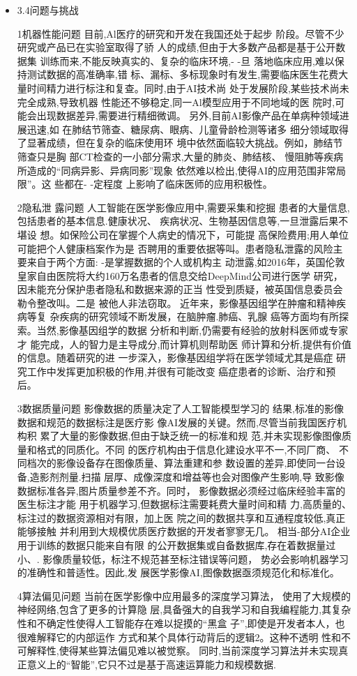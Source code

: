 \documentclass{article}
\begin{document}
\begin{itemize}
    \item 3.4问题与挑战\par
    1机器性能问题
    目前,Al医疗的研究和开发在我国还处于起步 阶段。尽管不少研究或产品已在实验室取得了骄 人的成绩,但由于大多数产品都是基于公开数据集 训练而来,不能反映真实的、复杂的临床环境,- -旦 落地临床应用,难以保持测试数据的高准确率,错 标、漏标、多标现象时有发生,需要临床医生花费大 量时间精力进行标注和复查。同时,由于AI技术尚 处于发展阶段,某些技术尚未完全成熟,导致机器 性能还不够稳定,同一Al模型应用于不同地域的医 院时,可能会出现数据差异,需要进行精细微调。 另外,目前AI影像产品在单病种领域进展迅速,如 在肺结节筛查、糖尿病、眼病、儿童骨龄检测等诸多 细分领域取得了显著成绩，但在复杂的临床使用环 境中依然面临较大挑战。例如，肺结节筛查只是胸 部CT检查的一小部分需求,大量的肺炎、肺结核、 慢阻肺等疾病所造成的“同病异影、异病同影”现象 依然难以检出,使得AI的应用范围非常局限”。这 些都在- -定程度 上影响了临床医师的应用积极性。\par
    2隐私泄 露问题
    人工智能在医学影像应用中,需要采集和挖掘 患者的大量信息,包括患者的基本信息.健康状况、 疾病状况、生物基因信息等,一旦泄露后果不堪设 想。如保险公司在掌握个人病史的情况下，可能提 高保险费用;用人单位可能把个人健康档案作为是 否聘用的重要依据等叫。患者隐私泄露的风险主 要来自于两个方面: -是掌握数据的个人或机构主 动泄露,如2016年，英国伦敦皇家自由医院将大约160万名患者的信息交给DeepMind公司进行医学 研究，因未能充分保护患者隐私和数据来源的正当 性受到质疑，被英国信息委员会勒令整改叫。二是 被他人非法窃取。
    近年来，影像基因组学在肿瘤和精神疾病等复 杂疾病的研究领域不断发展，在脑肿瘤.肺癌、乳腺 癌等方面均有所探索。当然,影像基因组学的数据 分析和判断,仍需要有经验的放射科医师或专家才 能完成，人的智力是主导成分,而计算机则帮助医 师计算和分析,提供有价值的信息。随着研究的进 一步深入，影像基因组学将在医学领域尤其是癌症 研究工作中发挥更加积极的作用,并很有可能改变 癌症患者的诊断、治疗和预后。\par
    3数据质量问题
    影像数据的质量决定了人工智能模型学习的 结果,标准的影像数据和规范的数据标注是医疗影 像AI发展的关键。然而,尽管当前我国医疗机构积 累了大量的影像数据,但由于缺乏统一的标准和规 范,并未实现影像图像质量和格式的同质化。不同 的医疗机构由于信息化建设水平不一,不同厂商、 不同档次的影像设备存在图像质量、算法重建和参 数设置的差异,即使同一台设备,造影剂剂量.扫描 层厚、成像深度和增益等也会对图像产生影响,导 致影像数据标准各异,图片质量参差不齐。同时， 影像数据必须经过临床经验丰富的医生标注才能 用于机器学习,但数据标注需要耗费大量时间和精 力,高质量的、标注过的数据资源相对有限，加上医 院之间的数据共享和互通程度较低,真正能够接触 并利用到大规模优质医疗数据的开发者寥寥无几。 相当-部分AI企业用于训练的数据只能来自有限 的公开数据集或自备数据库,存在着数据量过小、. 影像质量较低，标注不规范甚至标注错误等问题， 势必会影响机器学习的准确性和普适性。因此,发 展医学影像AI,图像数据亟须规范化和标准化。
    \par
    4算法偏见问题
    当前在医学影像中应用最多的深度学习算法， 使用了大规模的神经网络,包含了更多的计算隐 层,具备强大的自我学习和自我编程能力,其复杂 性和不确定性使得人工智能存在难以捉摸的“黑盒 子”,即使是开发者本人，也很难解释它的内部运作 方式和某个具体行动背后的逻辑2。这种不透明 性和不可解释性,使得某些算法偏见难以被觉察。 同时,当前深度学习算法并未实现真正意义上的“智能”,它只不过是基于高速运算能力和规模数据.\par
    

\end{itemize}
\end{document}
